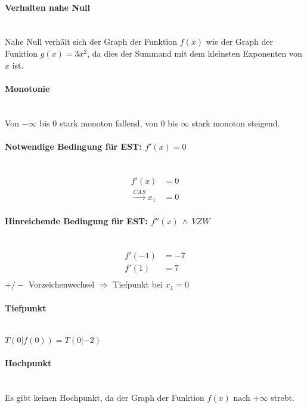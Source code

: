 \documentclass[arbeitsmappe.tex]{subfiles}
\begin{document}
    \paragraph{Verhalten nahe Null} \mbox{} \\
    Nahe Null verhält sich der Graph der Funktion $f(x)$ wie der Graph der Funktion $g(x) = 3x^2$, da dies der Summand mit dem kleinsten Exponenten von $x$ ist.
    \paragraph{Monotonie} \mbox{} \\
    Von $-\infty$ bis $0$ stark monoton fallend, von $0$ bis $\infty$ stark monoton steigend.

    \paragraph{Notwendige Bedingung für EST: $f'(x) = 0$} \mbox{} \\
    \begin{align*}
        f'(x) &= 0 \\
        \xrightarrow{CAS} x_1 &= 0
    \end{align*}

    \paragraph{Hinreichende Bedingung für EST: $f''(x)\ \land\ VZW$} \mbox{} \\
    \begin{align*}
        f'(-1) &= -7 \\
        f'(1) &= 7 \\
    \end{align*}
    $+/-$ Vorzeichenwechsel $\Rightarrow$ Tiefpunkt bei $x_1 = 0$
    \paragraph{Tiefpunkt} \mbox{} \\
    $T(0|f(0)) = T(0|-2)$
    \paragraph{Hochpunkt} \mbox{} \\
    Es gibt keinen Hochpunkt, da der Graph der Funktion $f(x)$ nach $+\infty$ strebt.
\end{document}
